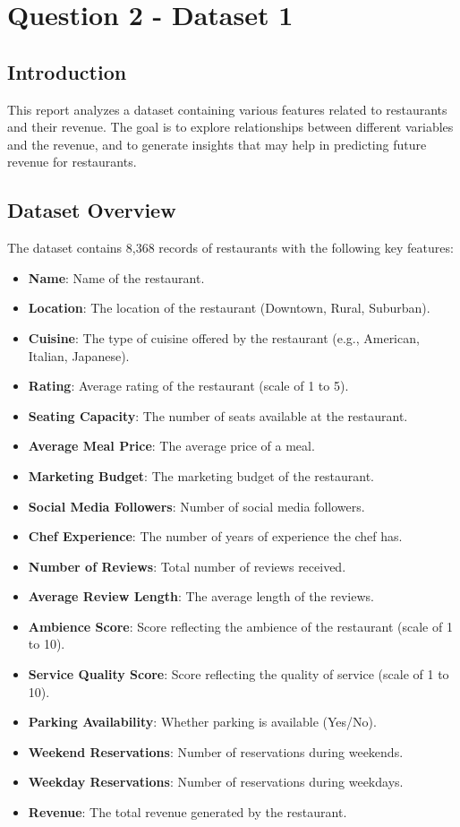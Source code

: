 \newpage
\section{Question 2 - Dataset 1}
\subsection{Introduction}
This report analyzes a dataset containing various features related to restaurants and their revenue. The goal is to explore relationships between different variables and the revenue, and to generate insights that may help in predicting future revenue for restaurants.

\subsection{Dataset Overview}
The dataset contains 8,368 records of restaurants with the following key features:
\begin{itemize}
    \item \textbf{Name}: Name of the restaurant.
    \item \textbf{Location}: The location of the restaurant (Downtown, Rural, Suburban).
    \item \textbf{Cuisine}: The type of cuisine offered by the restaurant (e.g., American, Italian, Japanese).
    \item \textbf{Rating}: Average rating of the restaurant (scale of 1 to 5).
    \item \textbf{Seating Capacity}: The number of seats available at the restaurant.
    \item \textbf{Average Meal Price}: The average price of a meal.
    \item \textbf{Marketing Budget}: The marketing budget of the restaurant.
    \item \textbf{Social Media Followers}: Number of social media followers.
    \item \textbf{Chef Experience}: The number of years of experience the chef has.
    \item \textbf{Number of Reviews}: Total number of reviews received.
    \item \textbf{Average Review Length}: The average length of the reviews.
    \item \textbf{Ambience Score}: Score reflecting the ambience of the restaurant (scale of 1 to 10).
    \item \textbf{Service Quality Score}: Score reflecting the quality of service (scale of 1 to 10).
    \item \textbf{Parking Availability}: Whether parking is available (Yes/No).
    \item \textbf{Weekend Reservations}: Number of reservations during weekends.
    \item \textbf{Weekday Reservations}: Number of reservations during weekdays.
    \item \textbf{Revenue}: The total revenue generated by the restaurant.
\end{itemize}
